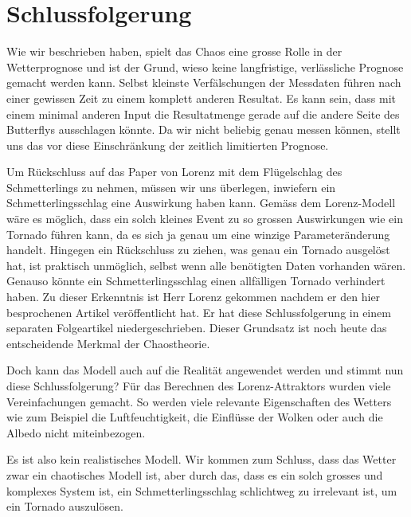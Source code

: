 \section{Schlussfolgerung}\label{outro}
Wie wir beschrieben haben, spielt das Chaos eine grosse Rolle in der Wetterprognose und ist der Grund, wieso keine langfristige, verlässliche Prognose gemacht werden kann. Selbst kleinste Verfälschungen der Messdaten führen nach einer gewissen Zeit zu einem komplett anderen Resultat. Es kann sein, dass mit einem minimal anderen Input die Resultatmenge gerade auf die andere Seite des Butterflys ausschlagen könnte. Da wir nicht beliebig genau messen können, stellt uns das vor diese Einschränkung der zeitlich limitierten Prognose.

Um Rückschluss auf das Paper von Lorenz mit dem Flügelschlag des Schmetterlings zu nehmen, müssen wir uns überlegen, inwiefern ein Schmetterlingsschlag eine Auswirkung haben kann. Gemäss dem Lorenz-Modell wäre es möglich, dass ein solch kleines Event zu so grossen Auswirkungen wie ein Tornado führen kann, da es sich ja genau um eine winzige Parameteränderung handelt. Hingegen ein Rückschluss zu ziehen, was genau ein Tornado ausgelöst hat, ist praktisch unmöglich, selbst wenn alle benötigten Daten vorhanden wären. Genauso könnte ein Schmetterlingsschlag einen allfälligen Tornado verhindert haben. Zu dieser Erkenntnis ist Herr Lorenz gekommen nachdem er den hier besprochenen Artikel veröffentlicht hat. Er hat diese Schlussfolgerung in einem separaten Folgeartikel\cite{lorenz63} niedergeschrieben. Dieser Grundsatz ist noch heute das entscheidende Merkmal der Chaostheorie.

Doch kann das Modell auch auf die Realität angewendet werden und stimmt nun diese Schlussfolgerung? Für das Berechnen des Lorenz-Attraktors wurden viele Vereinfachungen gemacht. So werden viele relevante Eigenschaften des Wetters wie zum Beispiel die Luftfeuchtigkeit, die Einflüsse der Wolken oder auch die Albedo nicht miteinbezogen. 

Es ist also kein realistisches Modell. Wir kommen zum Schluss, dass das Wetter zwar ein chaotisches Modell ist, aber durch das, dass es ein solch grosses und komplexes System ist, ein Schmetterlingsschlag schlichtweg zu irrelevant ist, um ein Tornado auszulösen. 
